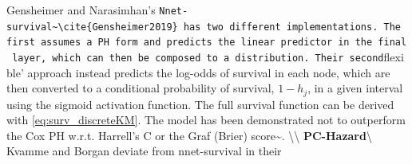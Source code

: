 \documentclass[
  letterpaper,
]{scrbook}
\theoremstyle{plain}
\theoremstyle{definition}
\theoremstyle{remark}
\begin{document}
Gensheimer and Narasimhan's
\texttt{Nnet-survival\textquotesingle{}\textasciitilde{}\textbackslash{}cite\{Gensheimer2019\}\ has\ two\ different\ implementations.\ The\ first\ assumes\ a\ PH\ form\ and\ predicts\ the\ linear\ predictor\ in\ the\ final\ layer,\ which\ can\ then\ be\ composed\ to\ a\ distribution.\ Their\ second}flexible'
approach instead predicts the log-odds of survival in each node, which
are then converted to a conditional probability of survival,
\(1 - h_j\), in a given interval using the sigmoid activation function.
The full survival function can be derived with \ref{eq:surv_discreteKM}.
The model has been demonstrated not to outperform the Cox PH w.r.t.
Harrell's C or the Graf (Brier)
score\textasciitilde{}\cite{Gensheimer2019}.
\textbackslash\textbackslash{}
\textbf{PC-Hazard}\label{mod:pchazard}\textbackslash{} Kvamme and Borgan
deviate from nnet-survival in their
\end{document}
